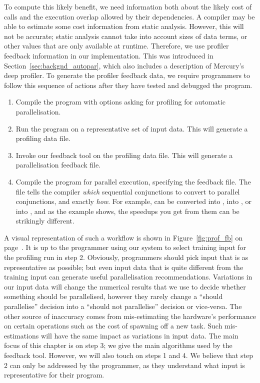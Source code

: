 To compute this likely benefit,
we need information
both about the likely cost of calls
and the execution overlap allowed by their dependencies.
A compiler may be able to estimate some cost information from static
analysis.
However, this will not be accurate;
static analysis cannot take into account sizes of data terms,
or other values that are only available at runtime.
Therefore, we use profiler feedback information in our implementation.
This was introduced in Section~\ref{sec:backgnd_autopar},
which also includes a description of Mercury's deep profiler.
To generate the profiler feedback data,
we require programmers to follow this sequence of actions after they have
tested and debugged the program.

\begin{enumerate}
\item
Compile the program
with options asking for profiling
for automatic parallelisation.
\item
Run the program on a representative set of input data.
This will generate a profiling data file.
\item
Invoke our feedback tool on the profiling data file.
This will generate a parallelisation feedback file.
\item
Compile the program for parallel execution,
specifying the feedback file.
The file tells the compiler
\emph{which} sequential conjunctions to convert to parallel conjunctions,
and exactly \emph{how}.
For example,  can be converted
into ,
into , or
into ,
and as the  example shows,
the speedups you get from them can be strikingly different.
\end{enumerate}

\noindent
A visual representation of such a workflow is shown in 
Figure~\ref{fig:prof_fb} on page~\pageref{fig:prof_fb}.
It is up to the programmer using our system
to select training input for the profiling run in step 2.
Obviously, programmers should pick input that is as representative as
possible;
but even input data that is quite different from the training input can
generate useful parallelisation recommendations.
Variations in our input data will change the numerical results
that we use to decide whether something should be parallelised,
however they rarely change a ``should parallelise'' decision into a
``should not parallelise'' decision or vice-versa.
The other source of inaccuracy comes from mis-estimating the hardware's
performance on certain operations such as the cost of spawning off a new
task.
Such mis-estimations will have the same impact as variations in input data.
The main focus of this chapter is on step 3;
we give the main algorithms used by the feedback tool.
However, we will also touch on steps 1 and 4.
We believe that step 2 can only be addressed by the programmer,
as they understand what input is representative for their program.

